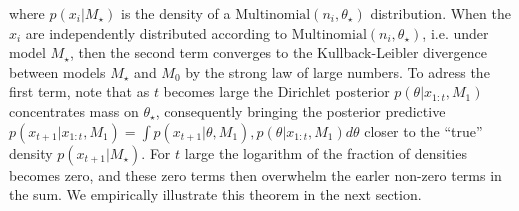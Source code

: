 \documentclass[11pt]{article}
\begin{document}
where  $p(x_i|M_\star)$ is the density of a $\text{Multinomial}(n_i,\theta_{\star})$ distribution.
When the $x_i$ are independently distributed according to $\text{Multinomial}(n_i, \theta_\star)$, i.e.
under model $M_\star$, then the second term converges to the Kullback-Leibler divergence between models $M_\star$ and $M_0$ by the strong law of large numbers.
To adress the first term, note that as $t$ becomes large the Dirichlet posterior $p(\theta|x_{1:t}, M_1)$ concentrates mass on $\theta_\star$, consequently bringing the posterior predictive $p(x_{t+1}|x_{1:t},M_1) =\int p(x_{t+1}|\theta,M_1),p(\theta|x_{1:t},M_1) d\theta$ closer to the ``true'' density $p(x_{t+1}|M_{\star})$.
For $t$ large the logarithm of the fraction of densities becomes zero, and these zero terms then overwhelm the earler non-zero terms in the sum.
We empirically illustrate this theorem in the next section.
\end{document}
